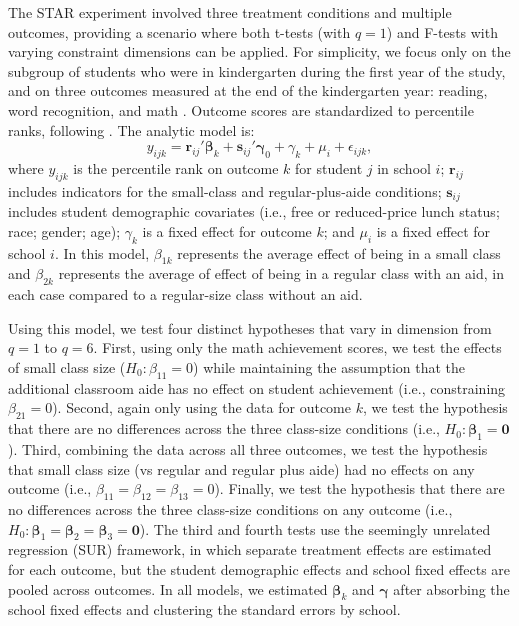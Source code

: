 \documentclass[12pt]{article}\usepackage[]{graphicx}\usepackage[]{color}
\newcommand{\bm}{\mathbf}
\newcommand{\bs}{\boldsymbol}
\begin{document}
The STAR experiment involved three treatment conditions and multiple outcomes, providing a scenario where both t-tests (with $q = 1$) and F-tests with varying constraint dimensions can be applied. 
For simplicity, we focus only on the subgroup of students who were in kindergarten during the first year of the study, and on three outcomes measured at the end of the kindergarten year: reading, word recognition, and math \citep{Achilles2008tennessee}. 
Outcome scores are standardized to percentile ranks, following \citet{Krueger2001effect}.
The analytic model is: 
\begin{equation}
y_{ijk} = \bm{r}_{ij}'\bs\beta_k + \bm{s}_{ij}'\bs\gamma_0 + \gamma_k + \mu_i + \epsilon_{ijk}, 
\end{equation}
where $y_{ijk}$ is the percentile rank on outcome $k$ for student $j$ in school $i$; $\bm{r}_{ij}$ includes indicators for the small-class and regular-plus-aide conditions; $\bm{s}_{ij}$ includes student demographic covariates (i.e., free or reduced-price lunch status; race; gender; age); $\gamma_k$ is a fixed effect for outcome $k$; and $\mu_i$ is a fixed effect for school $i$. 
In this model, $\beta_{1k}$ represents the average effect of being in a small class and $\beta_{2k}$ represents the average of effect of being in a regular class with an aid, in each case compared to a regular-size class without an aid.

Using this model, we test four distinct hypotheses that vary in dimension from $q = 1$ to $q = 6$. 
First, using only the math achievement scores, we test the effects of small class size ($H_0: \beta_{11} = 0$) while maintaining the assumption that the additional classroom aide has no effect on student achievement (i.e., constraining $\beta_{21} = 0$). 
Second, again only using the data for outcome $k$, we test the hypothesis that there are no differences across the three class-size conditions (i.e., $H_0: \bs\beta_1 = \bm{0}$). 
Third, combining the data across all three outcomes, we test the hypothesis that small class size (vs regular and regular plus aide) had no effects on any outcome (i.e., $\beta_{11} = \beta_{12} = \beta_{13} = 0$).
Finally, we test the hypothesis that there are no differences across the three class-size conditions on any outcome (i.e., $H_0: \bs\beta_1 = \bs\beta_2 = \bs\beta_3 = \bm{0}$). 
The third and fourth tests use the seemingly unrelated regression (SUR) framework, in which separate treatment effects are estimated for each outcome, but the student demographic effects and school fixed effects are pooled across outcomes. 
In all models, we estimated $\bs\beta_k$ and $\bs\gamma$ after absorbing the school fixed effects and clustering the standard errors by school.
\end{document}
